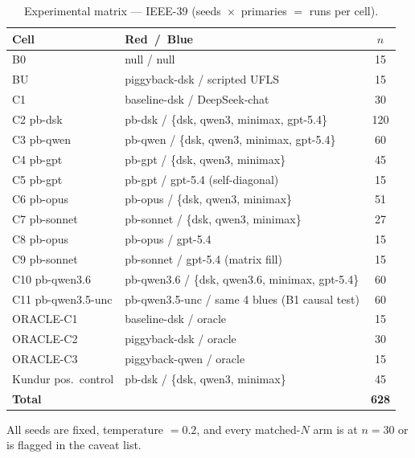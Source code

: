 \documentclass[journal,twocolumn,10pt]{IEEEtran}
\begin{document}
\begin{table}[tb]
\centering
\caption{Experimental matrix --- IEEE-39 (seeds~$\times$~primaries $=$ runs per cell).}
\label{tab:design}
\small
\begin{tabular}{@{}llc@{}}
\toprule
Cell & Red~/~Blue & $n$ \\
\midrule
B0          & null / null                                  & 15 \\
BU          & piggyback-dsk / scripted UFLS                & 15 \\
C1          & baseline-dsk / DeepSeek-chat                 & 30 \\
C2 pb-dsk   & pb-dsk / \{dsk, qwen3, minimax, gpt-5.4\}    & 120 \\
C3 pb-qwen  & pb-qwen / \{dsk, qwen3, minimax, gpt-5.4\}   & 60 \\
C4 pb-gpt   & pb-gpt / \{dsk, qwen3, minimax\}             & 45 \\
C5 pb-gpt   & pb-gpt / gpt-5.4 (self-diagonal)             & 15 \\
C6 pb-opus  & pb-opus / \{dsk, qwen3, minimax\}            & 51 \\
C7 pb-sonnet & pb-sonnet / \{dsk, qwen3, minimax\}         & 27 \\
C8 pb-opus  & pb-opus / gpt-5.4                            & 15 \\
C9 pb-sonnet & pb-sonnet / gpt-5.4 (matrix fill)           & 15 \\
C10 pb-qwen3.6 & pb-qwen3.6 / \{dsk, qwen3.6, minimax, gpt-5.4\} & 60 \\
C11 pb-qwen3.5-unc & pb-qwen3.5-unc / same 4 blues (B1 causal test) & 60 \\
ORACLE-C1   & baseline-dsk / oracle                        & 15 \\
ORACLE-C2   & piggyback-dsk / oracle                       & 30 \\
ORACLE-C3   & piggyback-qwen / oracle                      & 15 \\
\midrule
Kundur pos.\ control & pb-dsk / \{dsk, qwen3, minimax\}    & 45 \\
\midrule
\textbf{Total} & & \textbf{628} \\
\bottomrule
\end{tabular}
\end{table}

All seeds are fixed, temperature $= 0.2$, and every matched-$N$ arm is at $n = 30$ or is flagged in the caveat list.

\end{document}

